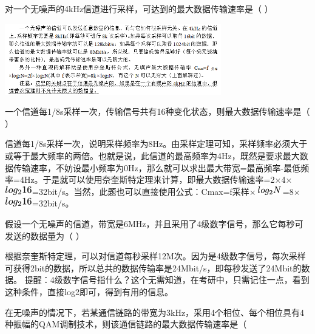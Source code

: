 \question 对一个无噪声的4kHz信道进行采样，可达到的最大数据传输速率是（ ）
\par{}
\begin{solution}\includegraphics[width=3.70833in,height=1.21875in]{computerassets/B0AE585B95CFFFFD9D175FCB4B196857.png}
\end{solution}
\question 一个信道每1/8s采样一次，传输信号共有16种变化状态，则最大数据传输速率是（
）
\par{}
\begin{solution}信道每1/8s采样一次，说明采样频率为8Hz。由采样定理可知，采样频率必须大于或等于最大频率的两倍。也就是说，此信道的最高频率为4Hz，既然是要求最大数据传输速率，不妨设最小频率为0Hz，那么就可以求出最大带宽=最高频率-最低频率=4Hz。于是就可以使用奈奎斯特定理来计算，即最大数据传输速率=2×4×\includegraphics[width=0.46875in,height=0.15625in]{texmath/8d88685Cdpi7B3507Dlog_216}=32bit/s。当然，此题也可以直接使用公式：Cmax=f采样×\includegraphics[width=0.45833in,height=0.14583in]{texmath/b7c31d5Cdpi7B3507Dlog_2N}=8×\includegraphics[width=0.46875in,height=0.15625in]{texmath/8d88685Cdpi7B3507Dlog_216}=32bit/s。
\end{solution}
\question 假设一个无噪声的信道，带宽是6MHz，并且采用了4级数字信号，那么它每秒可发送的数据量为（
）
\par{}
\begin{solution}根据奈奎斯特定理，可以对信道每秒采样12M次。因为是4级数字信号，每次采样可获得2bit的数据，所以总共的数据传输率是24Mbit/s，即每秒发送了24Mbit的数据。
提醒：4级数字信号指什么？这个无需知道，在考研中，只需记住一点，看到这种条件，直接log2即可，得到有用的信息。
\end{solution}
\question 在无噪声的情况下，若某通信链路的带宽为3kHz，采用4个相位、每个相位具有4种振幅的QAM调制技术，则该通信链路的最大数据传输速率是（

